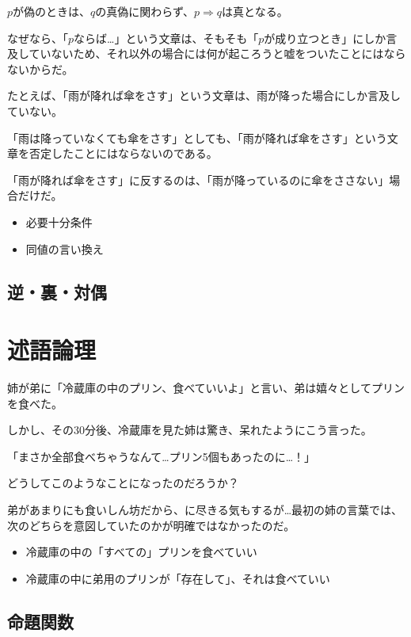 \documentclass[../../imaging-math]{subfiles}
\begin{document}
$p$が偽のときは、$q$の真偽に関わらず、$p \Rightarrow q$は真となる。

なぜなら、「$p$ならば…」という文章は、そもそも「$p$が成り立つとき」にしか言及していないため、それ以外の場合には何が起ころうと嘘をついたことにはならないからだ。

\br

たとえば、「雨が降れば傘をさす」という文章は、雨が降った場合にしか言及していない。

「雨は降っていなくても傘をさす」としても、「雨が降れば傘をさす」という文章を否定したことにはならないのである。

「雨が降れば傘をさす」に反するのは、「雨が降っているのに傘をささない」場合だけだ。

\begin{mindflow}
  \begin{itemize}
    \item 必要十分条件
    \item 同値の言い換え
  \end{itemize}
\end{mindflow}

\subsection{逆・裏・対偶}

\section{述語論理}

姉が弟に「冷蔵庫の中のプリン、食べていいよ」と言い、弟は嬉々としてプリンを食べた。

しかし、その30分後、冷蔵庫を見た姉は驚き、呆れたようにこう言った。

「まさか全部食べちゃうなんて…プリン5個もあったのに…！」

\br

どうしてこのようなことになったのだろうか？

弟があまりにも食いしん坊だから、に尽きる気もするが…最初の姉の言葉では、次のどちらを意図していたのかが明確ではなかったのだ。

\begin{itemize}
  \item 冷蔵庫の中の「すべての」プリンを食べていい
  \item 冷蔵庫の中に弟用のプリンが「存在して」、それは食べていい
\end{itemize}

\subsection{命題関数}
\end{document}
